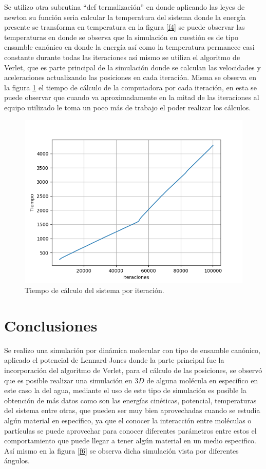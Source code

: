 \documentclass[3pt,twocolumn]{elsarticle}
\begin{document}
Se utilizo otra subrutina “def termalización” \cite{ana} en donde aplicando las leyes de newton su función seria calcular la temperatura del sistema donde la energía presente se transforma en temperatura en la figura \ref{f4} se puede observar las temperaturas en donde se observa que la simulación en cuestión es de tipo ensamble canónico en donde la energía así como la temperatura permanece casi constante durante todas las iteraciones así mismo se utiliza el algoritmo de Verlet, que es parte principal de la simulación donde se calculan las velocidades y aceleraciones actualizando las posiciones en cada iteración. Misma se observa en la figura \ref{f5} el tiempo de cálculo de la computadora por cada iteración, en esta se puede observar que cuando va aproximadamente en la mitad de las iteraciones al equipo utilizado le toma un poco más de trabajo el poder realizar los cálculos.

\begin{figure}[h!]
\centering
\includegraphics[width=\linewidth]{tiempocalculo.png}
\caption{Tiempo de cálculo del sistema por iteración.}
\label{f5}
\end{figure}

\section{Conclusiones}\label{intr}
Se realizo una simulación por dinámica molecular con tipo de ensamble canónico, aplicado el potencial de Lennard-Jones donde la parte principal fue la incorporación del algoritmo de Verlet, para el cálculo de las posiciones, se observó que es posible realizar una simulación en $3D$ de alguna molécula en específico en este caso la del agua, mediante el uso de este tipo de simulación es posible la obtención de más datos como son las energías cinéticas, potencial, temperaturas del sistema entre otras, que pueden ser muy bien aprovechadas cuando se estudia algún material en específico, ya que el conocer la interacción entre moléculas o partículas se puede aprovechar para conocer diferentes parámetros entre estos el comportamiento que puede llegar a tener algún material en un medio especifico.
Así mismo en la figura \ref{f6} se observa dicha simulación vista por diferentes ángulos.
\end{document}
